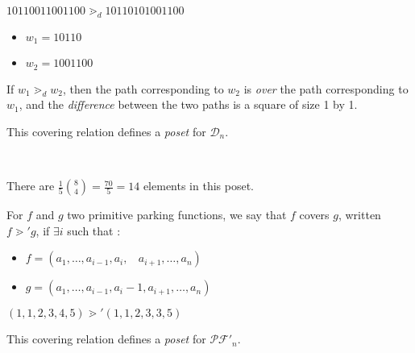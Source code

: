 \begin{example}[$n = 7$]
    $10110011001100 \gtrdot_d 10110101001100$
    \begin{itemize}
        \item $w_1 = 10110$
        \item $w_2 = 1001100$
    \end{itemize}
    
\end{example}

\begin{rem}
    If $w_1 \gtrdot_d w_2$, then the path corresponding to
    $w_2$ is \emph{over} the path corresponding to $w_1$,
    and the \emph{difference} between the two paths is a
    square of size 1 by 1.
\end{rem}

\begin{prop}
    This covering relation defines a \emph{poset}
    for $\mathcal{D}_n$.
\end{prop}

\begin{example}
    ~\\
    \begin{center}
        
        There are $\frac {1}{5} \binom{8}{4} = \frac{70}{5} = 14$
        elements in this poset.
    \end{center}
\end{example}

\begin{definition}[$\gtrdot'$]
    For $f$ and $g$ two primitive parking functions, we say
    that $f$ covers $g$, written $f \gtrdot' g$, if
    $\exists i$ such that :
    \begin{itemize}
        \item $f = (a_1, \ldots, a_{i-1}, a_i,\ \ \ \ 
            a_{i+1}, \ldots, a_n)$
        \item $g = (a_1, \ldots, a_{i-1}, a_i - 1, a_{i+1},
        \ldots, a_n)$
    \end{itemize}
\end{definition}

\begin{example}[$n = 6$]
    $(1, 1, 2, 3, 4, 5) \gtrdot' (1, 1, 2, 3, 3, 5)$    
\end{example}

\begin{prop}
    This covering relation defines a \emph{poset}
    for $\mathcal{PF'}_n$.
\end{prop}

